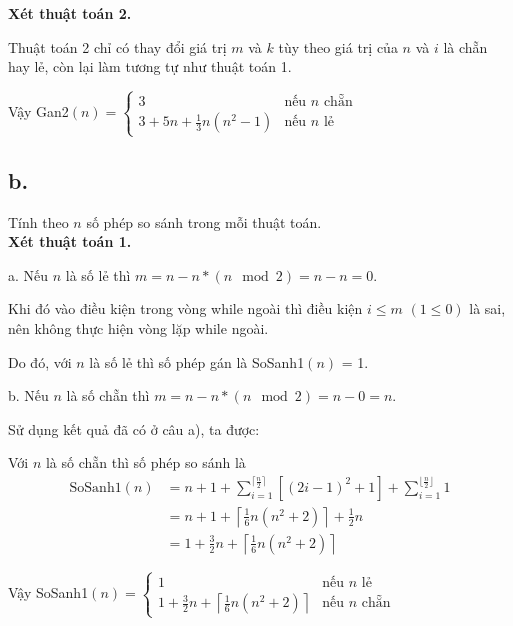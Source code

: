 \documentclass[12pt, a4paper, fleqn]{article}
\begin{document}
	\hfill \break

	\textbf{Xét thuật toán 2.}
	
	Thuật toán 2 chỉ có thay đổi giá trị $m$ và $k$ tùy theo giá trị của $n$ và $i$ là chẵn hay lẻ, còn lại làm tương tự như thuật toán 1.
	
	Vậy Gan2$(n) = {
		\begin{cases}
		3 & {\text{nếu $n$ chẵn}} \\
		\displaystyle 3 + 5n + \frac{1}{3} n(n^2 - 1) & {\text{nếu $n$ lẻ}}
		\end{cases}
	}$
	
	\subsection*{b.}
	
	Tính theo $n$ số phép so sánh trong mỗi thuật toán. \\
	
	\textbf{Xét thuật toán 1.}
	
	a. Nếu $n$ là số lẻ thì $m = n - n*(n \mod 2) = n - n = 0$.
	
	Khi đó vào điều kiện trong vòng while ngoài thì điều kiện $i \leq m$ $(1 \leq 0)$ là sai, nên không thực hiện vòng lặp while ngoài.
	
	Do đó, với $n$ là số lẻ thì số phép gán là SoSanh1$(n)$ = 1.
	
	b. Nếu $n$ là số chẵn thì $m = n - n*(n \mod 2) = n - 0 = n$.
	
	Sử dụng kết quả đã có ở câu a), ta được:
	
	Với $n$ là số chẵn thì số phép so sánh là
	\begin{align*}
	\text{SoSanh1}(n) &= n + 1 + \sum_{i = 1}^{\lceil \frac{n}{2} \rceil} \left[ (2i - 1)^2 + 1 \right] + \sum_{i = 1}^{\lfloor \frac{n}{2} \rfloor} 1 \\
					  &= n + 1 + \left\lceil \frac{1}{6} n(n^2 + 2) \right\rceil + \frac{1}{2} n \\
					  &= 1 + \frac{3}{2} n + \left\lceil \frac{1}{6} n(n^2 + 2) \right\rceil
	\end{align*}
	
	Vậy SoSanh1$(n) = {
		\begin{cases}
		1 & {\text{nếu $n$ lẻ}} \\
		\displaystyle 1 + \frac{3}{2} n + \left\lceil \frac{1}{6} n(n^2 + 2) \right\rceil & {\text{nếu $n$ chẵn}}
		\end{cases}
	}$

	\hfill \break
\end{document}
